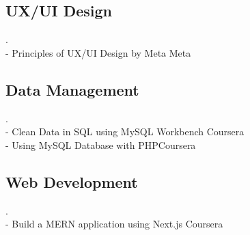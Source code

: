 \documentclass[a4paper,10pt]{article}
\begin{document}
\subsection*{UX/UI Design}.\vspace{2pt}\\
- Principles of UX/UI Design by Meta \hfill Meta
\vspace{2pt}
\subsection*{Data Management}.\vspace{2pt}\\
- Clean Data in SQL using MySQL Workbench \hfill Coursera \\
- Using MySQL Database with PHP\hfill Coursera
\vspace{2pt}
\subsection*{Web Development}.\vspace{2pt}\\
- Build a MERN application using Next.js \hfill Coursera
\end{document}
